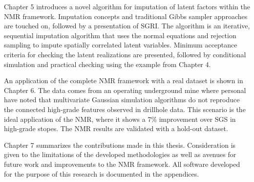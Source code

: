 Chapter 5 introduces a novel algorithm for imputation of latent factors within the \gls{NMR} framework. Imputation concepts and traditional Gibbs sampler approaches are touched on, followed by a presentation of \acrfull{SGRI}. The algorithm is an iterative, sequential imputation algorithm that uses the normal equations and rejection sampling to impute spatially correlated latent variables. Minimum acceptance criteria for checking the latent realizations are presented, followed by conditional simulation and practical checking using the example from Chapter 4.

An application of the complete \gls{NMR} framework with a real dataset is shown in Chapter 6. The data comes from an operating underground mine where personal have noted that multivariate Gaussian simulation algorithms do not reproduce the connected high-grade features observed in drillhole data. This scenario is the ideal application of the \gls{NMR}, where it shows a 7\% improvement over \gls{SGS} in high-grade stopes. The \gls{NMR} results are validated with a hold-out dataset.

Chapter 7 summarizes the contributions made in this thesis. Consideration is given to the limitations of the developed methodologies as well as avenues for future work and improvements to the \gls{NMR} framework. All software developed for the purpose of this research is documented in the appendices.